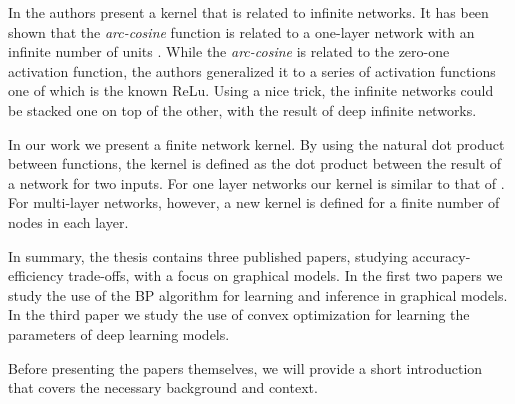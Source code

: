  

In  \cite{cho2009kernel} the authors present a kernel that is related to infinite networks.
It has been shown that the \textit{arc-cosine} function is related to a one-layer network with an infinite number of units  \cite{williams1998computation}.
While the \textit{arc-cosine} is related to the zero-one activation function, the authors generalized it to a series of activation functions one of which is the known ReLu.
Using a nice trick, the infinite networks could be stacked one on top of the other, with the result of deep infinite networks.

In our work  \cite{heinemann2016improper} we present a finite network kernel.
By using the natural dot product between functions, the kernel is defined as the dot product between the result of a network for two inputs.
For one layer networks our kernel is similar to that of  \cite{cho2009kernel}.
For multi-layer networks, however, a new kernel is defined for a finite number of nodes in each layer.

In summary, the thesis contains three published papers, studying accuracy-efficiency trade-offs, with a focus on graphical models. In the first two papers we study the use of the BP algorithm for learning and inference in graphical models. In the third paper we study the use of convex optimization for learning the parameters of deep learning models. 

Before presenting the papers themselves, we will provide a short introduction that covers the necessary background and context.
 

